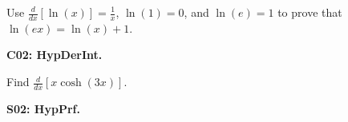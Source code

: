 \documentclass[12pt]{article}
\newcommand{\csch}{\operatorname{csch}}
\newcommand{\sech}{\operatorname{sech}}
\newcommand{\<}{\left\langle}
\renewcommand{\>}{\right\rangle}
\newcommand{\exerciseHeader}[4]{


  \vspace{0.5em}
  \textbf{#2}
  \vspace{0.5em}

}
\begin{document}
\begin{multicols}{2}
Use \(\frac{d}{dx}[\ln(x)]=\frac{1}{x}\), \(\ln(1)=0\), and \(\ln(e)=1\) to
prove that \(\ln(ex)=\ln(x)+1\).



%
%
%
%

%
%
%
%

%
%
%
%

%

\exerciseHeader{2017 June 09}{C02: HypDerInt.}{
Find derivatives and integrals involving hypberbolic functions.
}{4/4}

Find \(\frac{d}{dx}[x\cosh(3x)].\)


%
%

%

%

\exerciseHeader{2017 June 09}{S02: HypPrf.}{
Prove hyperbolic function identities.
}{3/3}


\end{multicols}
\end{document}
